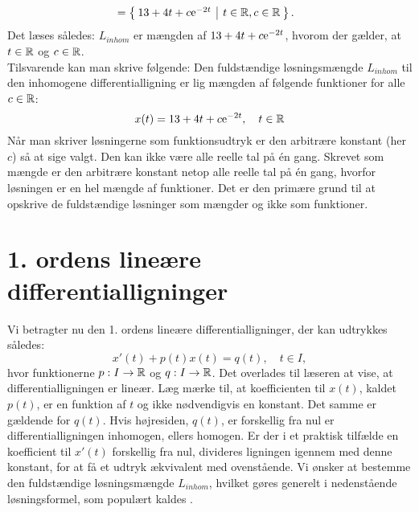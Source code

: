 \begin{example}[Løsningsstruktur]
\begin{equation}
\begin{aligned}
&= \left\lbrace \hspace*{-1mm} \begin{array}{c|c} 13 + 4t + c\mathrm{e}^{-2t} & t \in \mathbb{R}, c \in \mathbb{R} \end{array} \hspace*{-1mm} \right\rbrace.
\end{aligned}
\end{equation}
Det læses således: $ L_{inhom} $ er mængden af $ 13 + 4t + c\mathrm{e}^{-2t} $, hvorom der gælder, at $ t \in \mathbb{R} $ og $ c \in \mathbb{R} $. \\
Tilsvarende kan man skrive følgende: Den fuldstændige løsningsmængde $ L_{inhom} $ til den inhomogene differentialligning er lig mængden af følgende funktioner for alle $ c \in \mathbb{R} $:
\begin{equation}
x(t) = 13 + 4t + c\mathrm{e}^{-2t}, \quad t \in \mathbb{R}
\end{equation}
Når man skriver løsningerne som funktionsudtryk er den arbitrære konstant (her $ c $) så at sige valgt. Den kan ikke være alle reelle tal på én gang. Skrevet som mængde er den arbitrære konstant netop alle reelle tal på én gang, hvorfor løsningen er en hel mængde af funktioner. Det er den primære grund til at opskrive de fuldstændige løsninger som mængder og ikke som funktioner.
\end{example}

\section{1. ordens lineære differentialligninger} \label{sek.lindiff1o1}

Vi betragter nu den 1. ordens lineære differentialligninger, der kan udtrykkes således:
\begin{equation}
x'(t) + p(t)x(t) = q(t), \quad t \in I,
\end{equation}
hvor funktionerne $ p : I \rightarrow \mathbb{R}$ og $ q : I \rightarrow \mathbb{R} $. Det overlades til læseren at vise, at differentialligningen er lineær. Læg mærke til, at koefficienten til $ x(t) $, kaldet $ p(t) $, er en funktion af $ t $ og ikke nødvendigvis en konstant. Det samme er gældende for $ q(t) $. Hvis højresiden, $ q(t) $, er forskellig fra nul er differentialligningen inhomogen, ellers homogen. Er der i et praktisk tilfælde en koefficient til $ x'(t) $ forskellig fra nul, divideres ligningen igennem med denne konstant, for at få et udtryk ækvivalent med ovenstående. \bs
Vi ønsker at bestemme den fuldstændige løsningsmængde $ L_{inhom} $, hvilket gøres generelt i nedenstående løsningsformel, som populært kaldes .

